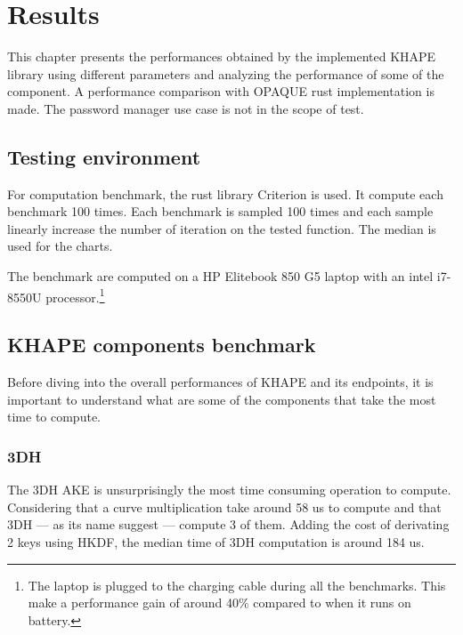 \documentclass[../report.tex]{subfiles}
\begin{document}

\chapter{Results} %

This chapter presents the performances obtained by the implemented KHAPE library using different parameters and analyzing the performance of some of the component. A performance comparison with OPAQUE rust implementation \cite{opaque-ke} is made. The password manager use case is not in the scope of test.

\section{Testing environment}

For computation benchmark, the rust library Criterion is used. It compute each benchmark 100 times.
Each benchmark is sampled 100 times and each sample linearly increase the number of iteration on the tested function.
The median is used for the charts.

The benchmark are computed on a HP Elitebook 850 G5 laptop with an intel i7-8550U processor.\footnote{The laptop is plugged to the charging cable during all the benchmarks. This make a performance gain of around 40\% compared to when it runs on battery.} 





\section{KHAPE components benchmark}

Before diving into the overall performances of KHAPE and its endpoints, it is important to understand what are some of the components that take the most time to compute.

\subsection{3DH}

The 3DH AKE is unsurprisingly the most time consuming operation to compute. Considering that a curve multiplication take around 58 us to compute and that 3DH --- as its name suggest --- compute 3 of them. Adding the cost of derivating 2 keys using HKDF, the median time of 3DH computation is around 184 us.
\end{document}
